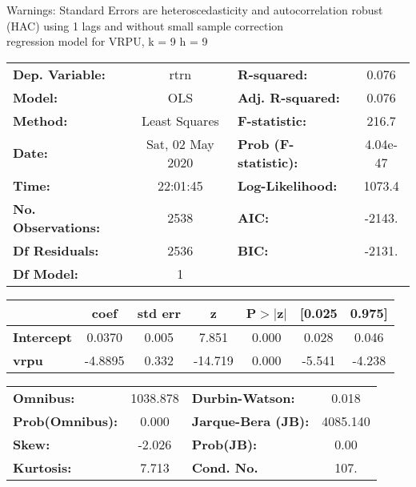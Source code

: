 Warnings: \newline
 [1] Standard Errors are heteroscedasticity and autocorrelation robust (HAC) using 1 lags and without small sample correction\\ 

regression model for VRPU, k = 9 h = 9\begin{center}
\begin{tabular}{lclc}
\toprule
\textbf{Dep. Variable:}    &       rtrn       & \textbf{  R-squared:         } &     0.076   \\
\textbf{Model:}            &       OLS        & \textbf{  Adj. R-squared:    } &     0.076   \\
\textbf{Method:}           &  Least Squares   & \textbf{  F-statistic:       } &     216.7   \\
\textbf{Date:}             & Sat, 02 May 2020 & \textbf{  Prob (F-statistic):} &  4.04e-47   \\
\textbf{Time:}             &     22:01:45     & \textbf{  Log-Likelihood:    } &    1073.4   \\
\textbf{No. Observations:} &        2538      & \textbf{  AIC:               } &    -2143.   \\
\textbf{Df Residuals:}     &        2536      & \textbf{  BIC:               } &    -2131.   \\
\textbf{Df Model:}         &           1      & \textbf{                     } &             \\
\bottomrule
\end{tabular}
\begin{tabular}{lcccccc}
                   & \textbf{coef} & \textbf{std err} & \textbf{z} & \textbf{P$> |$z$|$} & \textbf{[0.025} & \textbf{0.975]}  \\
\midrule
\textbf{Intercept} &       0.0370  &        0.005     &     7.851  &         0.000        &        0.028    &        0.046     \\
\textbf{vrpu}      &      -4.8895  &        0.332     &   -14.719  &         0.000        &       -5.541    &       -4.238     \\
\bottomrule
\end{tabular}
\begin{tabular}{lclc}
\textbf{Omnibus:}       & 1038.878 & \textbf{  Durbin-Watson:     } &    0.018  \\
\textbf{Prob(Omnibus):} &   0.000  & \textbf{  Jarque-Bera (JB):  } & 4085.140  \\
\textbf{Skew:}          &  -2.026  & \textbf{  Prob(JB):          } &     0.00  \\
\textbf{Kurtosis:}      &   7.713  & \textbf{  Cond. No.          } &     107.  \\
\bottomrule
\end{tabular}
\end{center}

